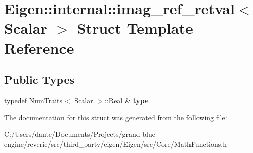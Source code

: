 \hypertarget{struct_eigen_1_1internal_1_1imag__ref__retval}{}\section{Eigen\+::internal\+::imag\+\_\+ref\+\_\+retval$<$ Scalar $>$ Struct Template Reference}
\label{struct_eigen_1_1internal_1_1imag__ref__retval}
\subsection*{Public Types}
\begin{DoxyCompactItemize}
\item 
\mbox{\label{struct_eigen_1_1internal_1_1imag__ref__retval_ac46c4f4c93e3f62bbf08df5ff2405665}} 
typedef \mbox{\hyperlink{struct_eigen_1_1_num_traits}{Num\+Traits}}$<$ Scalar $>$\+::Real \& {\bfseries type}
\end{DoxyCompactItemize}


The documentation for this struct was generated from the following file\+:\begin{DoxyCompactItemize}
\item 
C\+:/\+Users/dante/\+Documents/\+Projects/grand-\/blue-\/engine/reverie/src/third\+\_\+party/eigen/\+Eigen/src/\+Core/Math\+Functions.\+h\end{DoxyCompactItemize}
